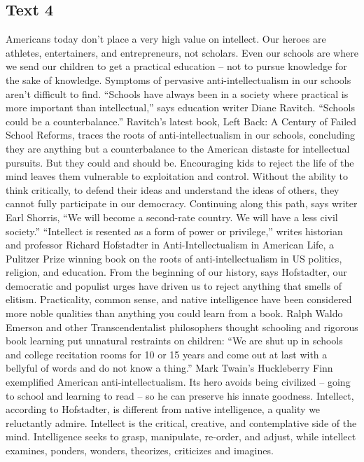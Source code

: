 {{{{{{{{{{\begin{questions}
\subsection{Text 4}
Americans today don’t place a very high value on intellect. Our heroes are athletes, entertainers, and entrepreneurs, not scholars. Even our schools are where we send our children to get a practical education -- not to pursue knowledge for the sake of knowledge. Symptoms of pervasive anti-intellectualism in our schools aren’t difficult to find.
“Schools have always been in a society where practical is more important than intellectual,” says education writer Diane Ravitch. “Schools could be a counterbalance.” Ravitch’s latest book, Left Back: A Century of Failed School Reforms, traces the roots of anti-intellectualism in our schools, concluding they are anything but a counterbalance to the American distaste for intellectual pursuits.
But they could and should be. Encouraging kids to reject the life of the mind leaves them vulnerable to exploitation and control. Without the ability to think critically, to defend their ideas and understand the ideas of others, they cannot fully participate in our democracy. Continuing along this path, says writer Earl Shorris, “We will become a second-rate country. We will have a less civil society.”
“Intellect is resented as a form of power or privilege,” writes historian and professor Richard Hofstadter in Anti-Intellectualism in American Life, a Pulitzer Prize winning book on the roots of anti-intellectualism in US politics, religion, and education. From the beginning of our history, says Hofstadter, our democratic and populist urges have driven us to reject anything that smells of elitism. Practicality, common sense, and native intelligence have been considered more noble qualities than anything you could learn from a book.
Ralph Waldo Emerson and other Transcendentalist philosophers thought schooling and rigorous book learning put unnatural restraints on children: “We are shut up in schools and college recitation rooms for 10 or 15 years and come out at last with a bellyful of words and do not know a thing.” Mark Twain’s Huckleberry Finn exemplified American anti-intellectualism. Its hero avoids being civilized -- going to school and learning to read -- so he can preserve his innate goodness.
Intellect, according to Hofstadter, is different from native intelligence, a quality we reluctantly admire. Intellect is the critical, creative, and contemplative side of the mind. Intelligence seeks to grasp, manipulate, re-order, and adjust, while intellect examines, ponders, wonders, theorizes, criticizes and imagines.

\end{questions}}}}}}}}}}}
